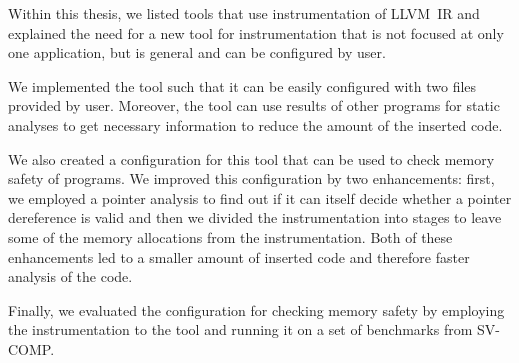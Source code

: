 Within this thesis, we listed tools that use instrumentation of LLVM~IR and
explained the need for a new tool for instrumentation that is not focused at
only one application, but is general and can be configured by user.

We implemented the tool such that it can be easily configured with two files
provided by user. Moreover, the tool can use results of other programs for
static analyses to get necessary information to reduce the amount of the
inserted code.

We also created a configuration for this tool that can be used to check memory
safety of programs. We improved this configuration by two enhancements: first,
we employed a pointer analysis to find out if it can itself decide whether a
pointer dereference is valid and then we divided the instrumentation into
stages to leave some of the memory allocations from the instrumentation. Both
of these enhancements led to a smaller amount of inserted code and therefore
faster analysis of the code.

Finally, we evaluated the configuration for checking memory safety by employing
the instrumentation to the tool \symbiotic and running it on a set of
benchmarks from SV-COMP.
